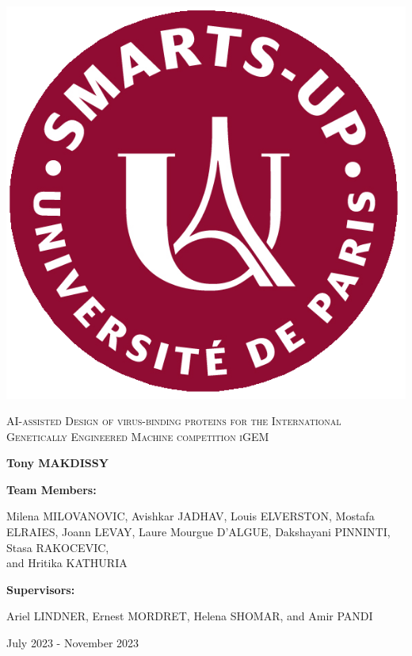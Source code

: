 \documentclass[11pt,a4paper]{article}
\begin{document}
\begin{titlepage}
\begin{minipage}{0.25\textwidth}
        \includegraphics[width=\linewidth]{Logos/SmartUP_1920-1 (1).png}\par\vspace{1cm}
    \end{minipage}

    {\scshape\Large AI-assisted Design of virus-binding proteins for the International
    Genetically Engineered Machine competition iGEM \par}
    \vspace{1cm}

    {\huge\bfseries Tony MAKDISSY \par}
    \vspace{1.5cm}

    \textbf{Team Members:}
    
    Milena MILOVANOVIC, Avishkar JADHAV, Louis ELVERSTON, Mostafa ELRAIES, Joann LEVAY, Laure Mourgue D'ALGUE, Dakshayani PINNINTI, Stasa RAKOCEVIC, \\ and Hritika KATHURIA
    \vspace{0.5cm}
    
    \textbf{Supervisors:}

    Ariel LINDNER, Ernest MORDRET, Helena SHOMAR, and Amir PANDI

    \vfill

    {\large July 2023 - November 2023\par}
\end{titlepage}
\end{document}
